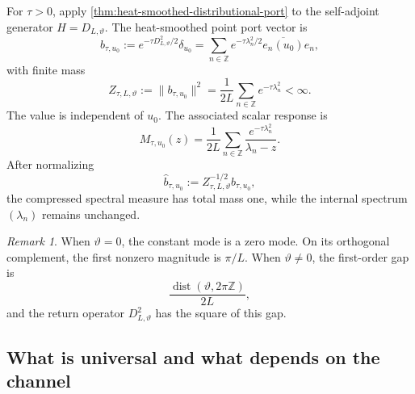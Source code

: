 \documentclass[11pt,reqno]{scrartcl}
\newcommand{\ZZ}{\mathbb Z}
\theoremstyle{plain}
\theoremstyle{definition}
\theoremstyle{remark}
\newtheorem{remark}[remark]{Remark}
\begin{document}
For \(\tau>0\), apply \cref{thm:heat-smoothed-distributional-port} to the self-adjoint
generator \(H=D_{L,\vartheta}\).  The heat-smoothed point port vector is
\begin{equation}
  b_{\tau,u_0}
  :=e^{-\tau D_{L,\vartheta}^2/2}\delta_{u_0}
  =\sum_{n\in\ZZ}
  e^{-\tau\lambda_n^2/2}\overline{e_n(u_0)}e_n,
  \label{eq:smoothed-point-vector}
\end{equation}
with finite mass
\begin{equation}
  Z_{\tau,L,\vartheta}
  :=\|b_{\tau,u_0}\|^2
  =\frac{1}{2L}\sum_{n\in\ZZ}e^{-\tau\lambda_n^2}<\infty.
  \label{eq:theta-mass}
\end{equation}
The value is independent of \(u_0\).  The associated scalar response is
\begin{equation}
  M_{\tau,u_0}(z)
  =\frac{1}{2L}\sum_{n\in\ZZ}
  \frac{e^{-\tau\lambda_n^2}}{\lambda_n-z}.
  \label{eq:quasiperiodic-smoothed-response}
\end{equation}
After normalizing
\begin{equation}
  \widehat b_{\tau,u_0}
  :=Z_{\tau,L,\vartheta}^{-1/2}b_{\tau,u_0},
  \label{eq:normalized-smoothed-point}
\end{equation}
the compressed spectral measure has total mass one, while the internal
spectrum \((\lambda_n)\) remains unchanged.

\begin{remark}
When \(\vartheta=0\), the constant mode is a zero mode.  On its orthogonal
complement, the first nonzero magnitude is \(\pi/L\).  When
\(\vartheta\ne0\), the first-order gap is
\begin{equation}
  \frac{\operatorname{dist}(\vartheta,2\pi\ZZ)}{2L},
\end{equation}
and the return operator \(D_{L,\vartheta}^2\) has the square of this gap.
\end{remark}

\subsection{What is universal and what depends on the channel}
\end{document}

